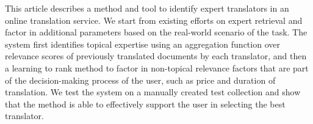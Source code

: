 
This article describes a method and tool to identify expert translators in an online translation service. We start from existing efforts on expert retrieval and factor in additional parameters based on the real-world scenario of the task. The system first identifies topical expertise using an aggregation function over relevance scores of previously translated documents by each translator, and then a learning to rank method to factor in non-topical relevance factors that are part of the decision-making process of the user, such as price and duration of translation. We test the system on a manually created test collection and show that the method is able to effectively support the user in selecting the best translator. 